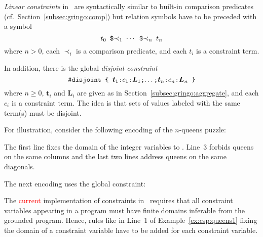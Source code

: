 \emph{Linear constraints} in \gringo\ are syntactically similar to built-in comparison predicates (cf.\ Section~\ref{subsec:gringo:comp})
but relation symbols have to be preceded with a \code{\$} symbol
\[\texttt{$t_0$~\$$\prec_1$~$\cdots$~\$$\prec_{n}$~$t_n$}\]
where $n>0$, each $\prec_i$ is a comparison predicate, and each $t_i$ is a constraint term.

In addition, there is the global \emph{disjoint constraint}
\[\texttt{\#disjoint~\{~$\boldsymbol{t}_1$:$c_1$:$\boldsymbol{L}_1$;$\dots$;$\boldsymbol{t}_n$:$c_n$:$\boldsymbol{L}_n$~\}}\]
where $n\geq 0$, $\boldsymbol{t}_i$ and $\boldsymbol{L}_i$ are given as in Section~\ref{subsec:gringo:aggregate},
and each $c_i$ is a constraint term.
%
The idea is that sets of values labeled with the same term(s) must be disjoint.

\begin{example}\label{ex:csp:queens1}
For illustration,
consider the following encoding of the $n$-queens puzzle:


The first line fixes the domain of the integer variables
 to .
Line~3 forbids queens on the same columns and the last two lines address queens on the same diagonals.
\end{example}

\begin{example}
The next encoding uses the global  constraint:
%
%

\end{example}

\begin{note}
The \textcolor{red}{current} implementation of constraints in \gringo\ requires 
that all constraint variables appearing in a program must have finite domains inferable from the grounded program.
Hence, rules like in Line~1 of Example~\ref{ex:csp:queens1} fixing the domain of a constraint variable have to be added for each constraint variable.
\end{note}


